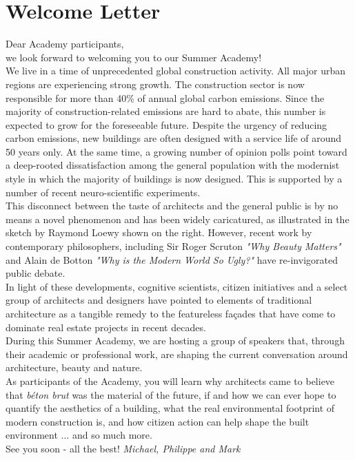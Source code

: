 \documentclass[a4paper]{article}
\begin{document}
\section*{Welcome Letter}
\label{sec:abstract}

\begin{minipage}{0.6\textwidth}

Dear Academy participants, \\

we look forward to welcoming you to our Summer Academy! \\

We live in a time of unprecedented global construction activity. All major urban regions are experiencing strong growth. The construction sector is now responsible for more than 40\% of annual global carbon emissions. Since the majority of construction-related emissions are hard to abate, this number is expected to grow for the foreseeable future. Despite the urgency of reducing carbon emissions, new buildings are often designed with a service life of around 50 years only. At the same time, a growing number of opinion polls point toward a deep-rooted dissatisfaction among the general population with the modernist style in which the majority of buildings is now designed. This is supported by a number of recent neuro-scientific experiments. \\

This disconnect between the taste of architects and the general public is by no means a novel phenomenon and has been widely caricatured, as illustrated in the sketch by Raymond Loewy shown on the right. However, recent work by contemporary philosophers, including Sir Roger Scruton \textit{"Why Beauty Matters"} and Alain de Botton \textit{"Why is the Modern World So Ugly?"} have re-invigorated public debate. \\

In light of these developments, cognitive scientists, citizen initiatives and a select group of architects and designers have pointed to elements of traditional architecture as a tangible remedy to the featureless façades that have come to dominate real estate projects in recent decades. \\

During this Summer Academy, we are hosting a group of speakers that, through their academic or professional work, are shaping the current conversation around architecture, beauty and nature. \\ 

As participants of the Academy, you will learn why architects came to believe that \textit{béton brut} was the material of the future, if and how we can ever hope to quantify the aesthetics of a building, what the real environmental footprint of modern construction is, and how citizen action can help shape the built environment $\dots$ and so much more. \\

See you soon - all the best!
\textit{Michael, Philippe and Mark}

\end{minipage}\hspace{15mm}
\end{document}
